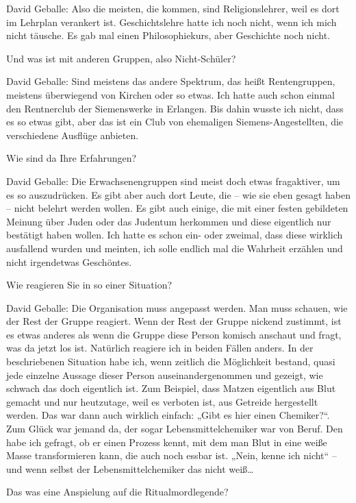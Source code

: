David Geballe: Also die meisten, die kommen, sind Religionslehrer, weil es dort im Lehrplan verankert ist. Geschichtslehre hatte ich noch nicht, wenn ich mich nicht täusche. Es gab mal einen Philosophiekurs, aber Geschichte noch nicht. 

 Und was ist mit anderen Gruppen, also Nicht-Schüler? 

David Geballe: Sind meistens das andere Spektrum, das heißt Rentengruppen, meistens überwiegend von Kirchen oder so etwas. Ich hatte auch schon einmal den Rentnerclub der Siemenswerke in Erlangen. Bis dahin wusste ich nicht, dass es so etwas gibt, aber das ist ein Club von ehemaligen Siemens-Angestellten, die verschiedene Ausflüge anbieten. 

Wie sind da Ihre Erfahrungen? 

David Geballe: Die Erwachsenengruppen sind meist doch etwas fragaktiver, um es so auszudrücken. Es gibt aber auch dort Leute, die – wie sie eben gesagt haben – nicht belehrt werden wollen. Es gibt auch einige, die mit einer festen gebildeten Meinung über Juden oder das Judentum herkommen und diese eigentlich nur bestätigt haben wollen. Ich hatte es schon ein- oder zweimal, dass diese wirklich ausfallend wurden und meinten, ich solle endlich mal die Wahrheit erzählen und nicht irgendetwas Geschöntes. 

Wie reagieren Sie in so einer Situation? 

David Geballe: Die Organisation muss angepasst werden. Man muss schauen, wie der Rest der Gruppe reagiert. Wenn der Rest der Gruppe nickend zustimmt, ist es etwas anderes als wenn die Gruppe diese Person komisch anschaut und fragt, was da jetzt los ist. Natürlich reagiere ich in beiden Fällen anders. 
In der beschriebenen Situation habe ich, wenn zeitlich die Möglichkeit bestand, quasi jede einzelne Aussage dieser Person auseinandergenommen und gezeigt, wie schwach das doch eigentlich ist. Zum Beispiel, dass Matzen eigentlich aus Blut gemacht und nur heutzutage, weil es verboten ist, aus Getreide hergestellt werden. Das war dann auch wirklich einfach: „Gibt es hier einen Chemiker?“. Zum Glück war jemand da, der sogar Lebensmittelchemiker war von Beruf. Den habe ich gefragt, ob er einen Prozess kennt, mit dem man Blut in eine weiße Masse transformieren kann, die auch noch essbar ist. „Nein, kenne ich nicht“ – und wenn selbst der Lebensmittelchemiker das nicht weiß… 

Das was eine Anspielung auf die Ritualmordlegende? 

